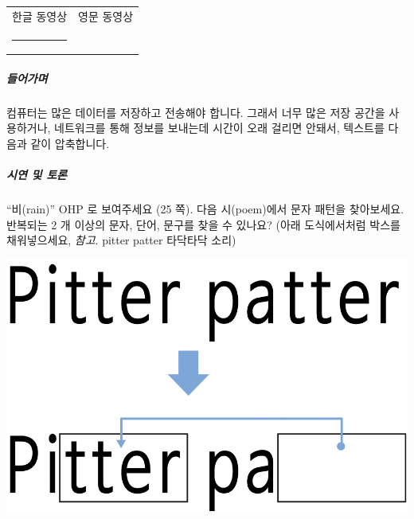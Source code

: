 \documentclass[]{article}
\begin{document}

\begin{longtable}[c]{@{}ll@{}}
\toprule
\begin{minipage}[t]{0.47\columnwidth}\raggedright\strut
한글 동영상
\strut\end{minipage} &
\begin{minipage}[t]{0.47\columnwidth}\raggedright\strut
영문 동영상
\strut\end{minipage}\tabularnewline
\begin{minipage}[t]{0.47\columnwidth}\raggedright\strut
\begin{center}\rule{0.5\linewidth}{\linethickness}\end{center}
\strut\end{minipage} &
\begin{minipage}[t]{0.47\columnwidth}\raggedright\strut
\strut\end{minipage}\tabularnewline
\bottomrule
\end{longtable}

\subparagraph{들어가며}\label{section-48}

컴퓨터는 많은 데이터를 저장하고 전송해야 합니다. 그래서 너무 많은 저장
공간을 사용하거나, 네트워크를 통해 정보를 보내는데 시간이 오래 걸리면
안돼서, 텍스트를 다음과 같이 압축합니다.

\subparagraph{시연 및 토론}\label{section-49}

``비(rain)'' OHP 로 보여주세요 (25 쪽). 다음 시(poem)에서 문자 패턴을
찾아보세요. 반복되는 2 개 이상의 문자, 단어, 문구를 찾을 수 있나요?
(아래 도식에서처럼 박스를 채워넣으세요, \emph{참고}. pitter patter
타닥타닥 소리)

\includegraphics{csunplugged/01-part/img/ch03-text/03-text-01-pitter-platter.png}
\end{document}
